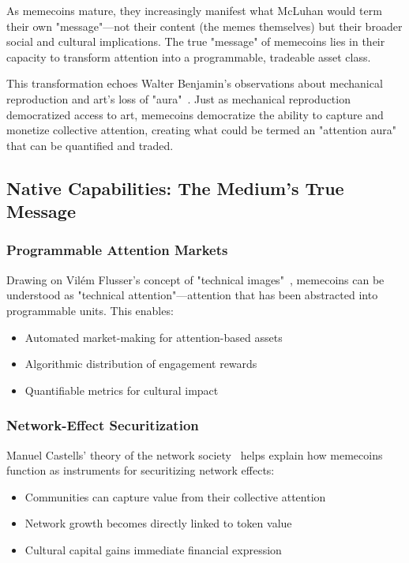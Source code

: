 \documentclass[a4paper,12pt]{article}
\begin{document}
As memecoins mature, they increasingly manifest what McLuhan would term their own "message"—not their content (the memes themselves) but their broader social and cultural implications. The true "message" of memecoins lies in their capacity to transform attention into a programmable, tradeable asset class.

This transformation echoes Walter Benjamin's observations about mechanical reproduction and art's loss of "aura"~\cite{benjamin1935work}. Just as mechanical reproduction democratized access to art, memecoins democratize the ability to capture and monetize collective attention, creating what could be termed an "attention aura" that can be quantified and traded.

\subsection{Native Capabilities: The Medium's True Message}

\subsubsection{Programmable Attention Markets}

Drawing on Vilém Flusser's concept of "technical images"~\cite{flusser2011into}, memecoins can be understood as "technical attention"—attention that has been abstracted into programmable units. This enables:

\begin{itemize}
    \item Automated market-making for attention-based assets
    \item Algorithmic distribution of engagement rewards
    \item Quantifiable metrics for cultural impact
\end{itemize}

\subsubsection{Network-Effect Securitization}

Manuel Castells' theory of the network society~\cite{castells2000rise} helps explain how memecoins function as instruments for securitizing network effects:

\begin{itemize}
    \item Communities can capture value from their collective attention
    \item Network growth becomes directly linked to token value
    \item Cultural capital gains immediate financial expression
\end{itemize}
\end{document}
